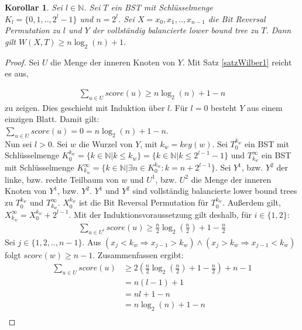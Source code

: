 \documentclass[a4paper,12pt]{article}
\begin{document}
\newtheorem{Korollar1}{Korollar}[section]
\begin{Korollar1} Sei $l \in \mathbb{N}$. Sei $T$ ein BST mit Schlüsselmenge\\ ${K_l = \{0,1,..,2^l -1\}}$ und $n = 2^l$. Sei $X = x_0, x_1,..,x_{n-1}$ die Bit Reversal Permutation zu $l$ und $Y$ der vollständig balancierte lower bound tree zu $T$. Dann gilt  $W\left(X,T\right) \geq n \log_2 \left(n\right) + 1 $. 
\end{Korollar1}
\begin{proof}
	Sei $U$ die Menge der inneren Knoten von $Y$. Mit Satz \ref{satzWilber1} reicht es aus, 
	
	\begin{align*}
	\sum_{u \in U} {\mathit{score}\left(u\right)} \geq n \log_2\left( n\right) + 1 - n 
	\end{align*} 
	zu zeigen. Dies geschieht mit Induktion über $l$. Für $l = 0$ besteht $Y$ aus einem einzigen Blatt. Damit gilt:\\ $ \sum_{u \in U} {\mathit{score}\left(u\right)} = 0 = n \log_2 \left(n\right) + 1 - n $. \\
	Nun sei $l > 0$. Sei $w$ die Wurzel von $Y$, mit $k_w = \mathit{key}(w)$. Sei $T_0^{k_w}$ ein BST mit Schlüsselmenge $K_0^{k_w} =\{k \in \mathbb{N}\vert k \leq k_w\} = \{k \in \mathbb{N}\vert k \leq 2^{l-1} - 1\}$ und $T_{k_w}^\infty$ ein BST mit Schlüsselmenge  $ K^\infty_{k_w} = \{k \in \mathbb{N}\vert \exists n \in K_0^{k_w}\colon  k = n + 2^{l-1}\}$. Sei $Y^1$, bzw. $Y^2$ der linke, bzw. rechte Teilbaum von $w$ und $U^1$, bzw. $U^2$ die Menge der inneren Knoten von $Y^1$, bzw. $Y^2$. $Y^1$ und $Y^2$ sind vollständig balancierte lower bound trees zu $T_0^{k_w}$ und $T_{k_w}^\infty$. $X^{k_w}_0$ ist die Bit Reversal Permutation für $T_0^{k_w}$. Außerdem gilt, $X_{k_w}^\infty = X^{k_w}_0 + 2^{l-1}$. Mit der Induktionsvoraussetzung gilt deshalb, für $i \in \{1,2\}$:
	\begin{align*}
	\sum_{u \in U^i} {\mathit{score}\left(u\right)} \geq  \frac{n}{2} \log_2 \left(\frac{n}{2} \right) + 1 - \frac{n}{2}  
	\end{align*}
	Sei $j \in \{1, 2,.., n-1\}$. Aus $\left(x_j < k_w \Rightarrow x_{j-1} > k_w \right) \land \left(x_j > k_w \Rightarrow x_{j-1} < k_w \right)$ folgt $\mathit{score}\left(w\right) \geq n-1$. Zusammenfassen ergibt:
	\begin{align*}
	\sum_{u \in U} {\mathit{score}\left(u\right)} &\geq 2 \left( \frac{n}{2}  \log_2 \left(\frac{n}{2} \right) + 1 - \frac{n}{2} \right) + n - 1\\	
	&= n (l-1)  + 1 \\	
	&= n l + 1 -n \\
	&= n \log_2\left( n\right) + 1 - n\\	
	\end{align*}
	
\end{proof}
\end{document}
